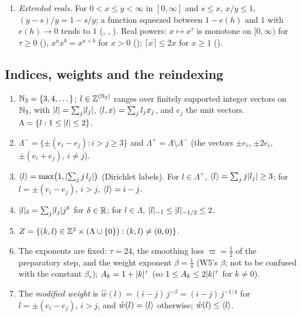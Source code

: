{\begin{enumerate}[label=(W7-E\arabic*),ref=(W7-E\arabic*)]
  $(-h,h)^2$ (, ); $\Leb\bigl(\prod_i(a_i,b_i)\bigr)=\prod_i(b_i-a_i)$
  ().
\item\label{bpW:w7:ext-ennreal} \emph{Extended reals.} For $0<x\le y<\infty$ in $[0,\infty]$ and $s\le x$,
  $x/y\le1$, $(y-s)/y=1-s/y$; a function squeezed between $1-e(h)$ and $1$ with $e(h)\to0$ tends to $1$
  (, , ).
  Real powers: $x\mapsto x^\tau$ is monotone on $[0,\infty)$ for $\tau\ge0$ (),
  $x^{a}x^{b}=x^{a+b}$ for $x>0$ (); $\lceil x\rceil\le 2x$ for $x\ge1$ ().
\end{enumerate}
\par}

\subsection{Indices, weights and the reindexing}\label{bpW:w7:indices}

\begin{definition}\label{bpW:w7:indexdef}
\begin{enumerate}[label=(\roman*)]
\item $\mathbb{N}_3=\{3,4,\dots\}$; $l\in\mathbb{Z}^{(\mathbb{N}_3)}$ ranges over finitely supported integer vectors on $\mathbb{N}_3$, with
  $\lvert l\rvert=\sum_j\lvert l_j\rvert$, $\langle l,x\rangle=\sum_jl_jx_j$, and $e_j$ the unit vectors. $\Lambda=\{l:1\le\lvert l\rvert\le2\}$.
\item $\Lambda^-=\{\pm(e_i-e_j):i>j\ge3\}$ and $\Lambda^+=\Lambda\setminus\Lambda^-$ (the vectors $\pm e_i$,
  $\pm2e_i$, $\pm(e_i+e_j)$, $i\neq j$).
\item $\langle l\rangle=\max\bigl(1,\lvert \sum_jj\,l_j\rvert\bigr)$ (Dirichlet labels). For $l\in\Lambda^+$,
  $\langle l\rangle=\sum_jj\lvert l_j\rvert\ge3$; for $l=\pm(e_i-e_j)$, $i>j$, $\langle l\rangle=i-j$.
\item $\lvert l\rvert_\delta=\sum_j\lvert l_j\rvert j^\delta$ for $\delta\in\mathbb{R}$; for $l\in\Lambda$, $\lvert l\rvert_{-1}\le\lvert l\rvert_{-1/2}\le2$.
\item $Z=\{(k,l)\in\mathbb{Z}^2\times(\Lambda\cup\{0\}):(k,l)\neq(0,0)\}$.
\item The exponents are fixed: $\tau=24$, the smoothing loss $\varpi=\frac12$ of the preparatory step, and the weight
  exponent $\beta=\frac14$ (W5's $\beta$; not to be confused with the constant $\beta_*$); $A_k=1+\lvert k\rvert^\tau$ (so $1\le A_k\le2\lvert k\rvert^\tau$ for
  $k\ne0$).
\item The \emph{modified weight} is $\hat w(l)=(i-j)\,j^{-\beta}=(i-j)\,j^{-1/4}$ for $l=\pm(e_i-e_j)$, $i>j$, and $\hat w(l)=\langle l\rangle$
  otherwise; $\hat w(l)\le\langle l\rangle$.
\end{enumerate}
\end{definition}

